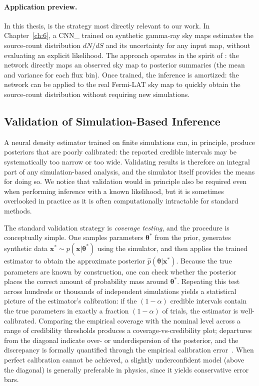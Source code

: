 \paragraph{Application preview.}

In this thesis, \NPE is the \SBI strategy most directly relevant to our work.
In Chapter~\ref{ch:6}, a \gls{CNN_} trained on synthetic gamma-ray sky maps estimates the source-count distribution $dN/dS$ and its uncertainty for any input map, without evaluating an explicit likelihood.
The approach operates in the spirit of \NPE: the network directly maps an observed sky map to posterior summaries (the mean and variance for each flux bin).
Once trained, the inference is amortized: the network can be applied to the real Fermi-LAT sky map to quickly obtain the source-count distribution without requiring new simulations.


\subsection{Validation of Simulation-Based Inference}
\label{sec:3.2.3}

A neural density estimator trained on finite simulations can, in principle, produce posteriors that are poorly calibrated: the reported credible intervals may be systematically too narrow or too wide.
Validating \SBI results is therefore an integral part of any simulation-based analysis, and the simulator itself provides the means for doing so.
We notice that validation would in principle also be required even when performing inference with a known likelihood, but it is sometimes overlooked in practice as it is often computationally intractable for standard \MCMC methods.

The standard validation strategy is \emph{coverage testing}, and the procedure is conceptually simple.
One samples parameters $\boldsymbol{\theta}^*$ from the prior, generates synthetic data $\mathbf{x}^* \sim p(\mathbf{x}|\boldsymbol{\theta}^*)$ using the simulator, and then applies the trained estimator to obtain the approximate posterior $\hat{p}(\boldsymbol{\theta}|\mathbf{x}^*)$.
Because the true parameters are known by construction, one can check whether the posterior places the correct amount of probability mass around $\boldsymbol{\theta}^*$.
Repeating this test across hundreds or thousands of independent simulations yields a statistical picture of the estimator's calibration: if the $(1-\alpha)$ credible intervals contain the true parameters in exactly a fraction $(1-\alpha)$ of trials, the estimator is well-calibrated.
Comparing the empirical coverage with the nominal level across a range of credibility thresholds produces a coverage-vs-credibility plot; departures from the diagonal indicate over- or underdispersion of the posterior, and the discrepancy is formally quantified through the empirical calibration error~\cite{Cranmer:2020,Hermans:2021rqv}. When perfect calibration cannot be achieved, a slightly underconfident model (above the diagonal) is generally preferable in physics, since it yields conservative error bars.

